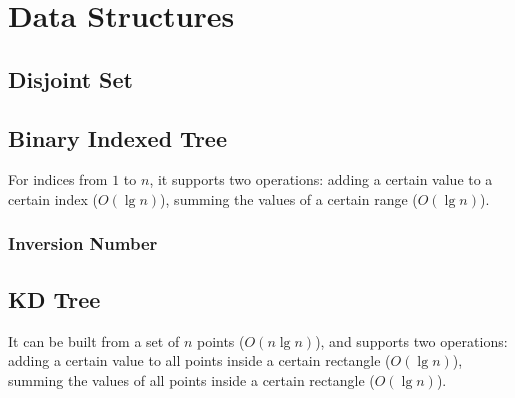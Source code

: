 \section{Data Structures} %

\subsection{Disjoint Set} %


\subsection{Binary Indexed Tree} %

For indices from $1$ to $n$, it supports two operations: adding a certain value to a certain index ($O(\lg{n})$), summing the values of a certain range ($O(\lg{n})$).


\subsubsection{Inversion Number} %



\subsection{KD Tree} %
It can be built from a set of $n$ points ($O(n\lg{n})$), and supports two operations: adding a certain value to all points inside a certain rectangle ($O(\lg{n})$), summing the values of all points inside a certain rectangle ($O(\lg{n})$).


